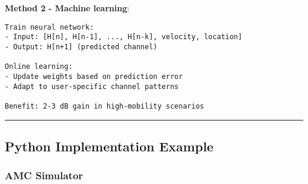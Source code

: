 \textbf{Method 2 - Machine learning}:

\begin{verbatim}
Train neural network:
- Input: [H[n], H[n-1], ..., H[n-k], velocity, location]
- Output: H[n+1] (predicted channel)

Online learning:
- Update weights based on prediction error
- Adapt to user-specific channel patterns

Benefit: 2-3 dB gain in high-mobility scenarios
\end{verbatim}

\begin{center}\rule{0.5\linewidth}{0.5pt}\end{center}

\subsection{\texorpdfstring{ Python Implementation
Example}{ Python Implementation Example}}\label{python-implementation-example}

\subsubsection{AMC Simulator}\label{amc-simulator}

